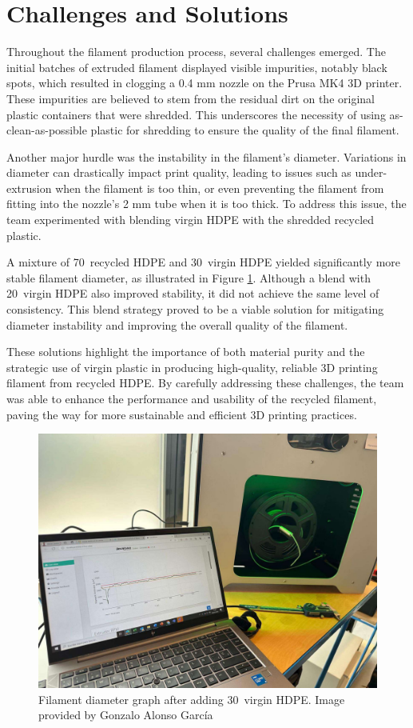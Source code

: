 \section{Challenges and Solutions}

Throughout the filament production process, several challenges emerged. The initial batches of 
extruded filament displayed visible impurities, notably black spots, which resulted in clogging a 
0.4 mm nozzle on the Prusa MK4 3D printer. These impurities are believed to stem from the residual 
dirt on the original plastic containers that were shredded. This underscores the necessity of 
using as-clean-as-possible plastic for shredding to ensure the quality of the final filament.

Another major hurdle was the instability in the filament's diameter. Variations in diameter can 
drastically impact print quality, leading to issues such as under-extrusion when the filament is 
too thin, or even preventing the filament from fitting into the nozzle's 2 mm tube when it is too 
thick. To address this issue, the team experimented with blending virgin HDPE with the shredded 
recycled plastic.

A mixture of 70\percentsign\  recycled HDPE and 30\percentsign\  virgin HDPE yielded significantly 
more stable filament diameter, as illustrated in Figure \ref{fig:filament_graph}. Although a blend 
with 20\percentsign\  virgin HDPE also improved stability, it did not achieve the same level of 
consistency. This blend strategy proved to be a viable solution for mitigating diameter 
instability and improving the overall quality of the filament.

These solutions highlight the importance of both material purity and the strategic use of virgin 
plastic in producing high-quality, reliable 3D printing filament from recycled HDPE. By carefully 
addressing these challenges, the team was able to enhance the performance and usability of the 
recycled filament, paving the way for more sustainable and efficient 3D printing practices.

\begin{figure}[h]
	\centering
	\includegraphics[width = .85\textwidth]{Imagenes/Vectorial/filament_graph.pdf}
	\caption{Filament diameter graph after adding 30\percentsign\ virgin HDPE. Image provided by 
    Gonzalo Alonso García}
	\label{fig:filament_graph}
\end{figure}

